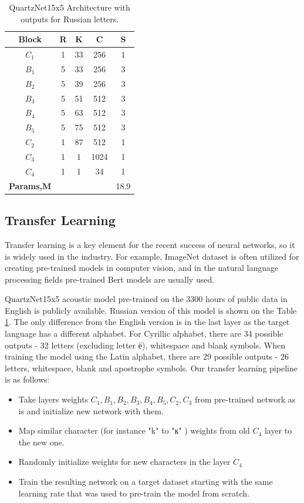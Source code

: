 \documentclass[a4paper]{article}
\begin{document}
\begin{table}[t]
  \caption{QuartzNet15x5 Architecture with outputs for Russian letters. }
  \label{tabular:Quartznet}
  \centering
  \begin{tabular}{ccccc}
    \toprule
    \textbf{Block}  & \textbf{R} & \textbf{K} & \textbf{C} & \textbf{S}     \\
    \midrule
    $C_1$  & 1 & 33 & 256 &  1  \\
    \midrule
    $B_1$  & 5 & 33 & 256 &  3  \\
    $B_2$  & 5 & 39 & 256 &  3  \\
    $B_3$  & 5 & 51 & 512 &  3  \\
    $B_4$  & 5 & 63 & 512 &  3  \\
    $B_5$  & 5 & 75 & 512 &  3  \\
    \midrule
    $C_2$  & 1 & 87 & 512 &  1  \\
    $C_3$  & 1 & 1 & 1024 &  1  \\
    $C_4$  & 1 & 1 & 34 &  1    \\
    \bottomrule
    \textbf{Params,M}  &  &  & &  18.9     \\
  \end{tabular}
\end{table}


\subsection{Transfer Learning}

Transfer learning is a key element for the recent success of neural networks, so it is widely used in the industry. For example, ImageNet dataset is often utilized for creating pre-trained models in computer vision, and in the natural language processing fields pre-trained Bert models are usually used. 

QuartzNet15x5 acoustic model pre-trained on the 3300 hours of public data in English is publicly available. Russian version of this model is shown on the Table \ref{tabular:Quartznet}. The only difference from the English version is in the last layer as the target language has a different alphabet. For Cyrillic alphabet, there are 34 possible outputs - 32 letters (excluding letter ё), whitespace and blank symbols. When training the model using the Latin alphabet, there are 29 possible outputs - 26 letters, whitespace, blank and apostrophe symbols. Our transfer learning pipeline is as follows:
\begin{itemize}
    \item Take layers weights $C_1, B_1, B_2, B_3, B_4, B_5, C_2, C_3$ from pre-trained network as is and initialize new network with them.
    \item Map similar character (for instance "k"  to "к" ) weights from old $C_4$ layer to the new one.
    \item Randomly initialize weights for new characters in the layer $C_4$
    \item Train the resulting network on a target dataset starting with the same learning rate that was used to pre-train the model from scratch.
\end{itemize}
\end{document}
